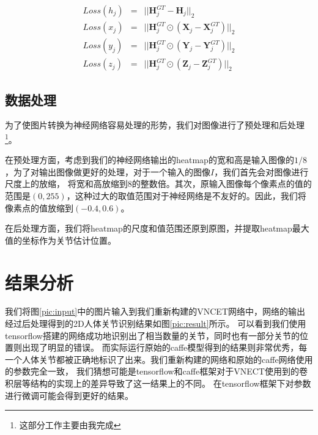 \documentclass[a4paper, 10pt]{article}
\newcommand{\bX}{\mathbf{X}}
\newcommand{\bY}{\mathbf{Y}}
\newcommand{\bZ}{\mathbf{Z}}
\newcommand{\bH}{\mathbf{H}}
\begin{document}
\begin{eqnarray}
        Loss(h_j)&=& || \bH^{GT}_{j}-\bH_j ||_2 \label{eqn:h}\\
        Loss(x_j)&=& || \bH^{GT}_{j}\odot(\bX_j-\bX^{GT}_{j}) ||_2 \label{eqn:x}\\
        Loss(y_j)&=& || \bH^{GT}_{j}\odot(\bY_j-\bY^{GT}_{j}) ||_2 \label{eqn:y}\\
        Loss(z_j)&=& || \bH^{GT}_{j}\odot(\bZ_j-\bZ^{GT}_{j}) ||_2 \label{eqn:z}
\end{eqnarray}


\subsection{数据处理}

\hspace{2em}为了使图片转换为神经网络容易处理的形势，我们对图像进行了预处理和后处理\footnote{这部分工作主要由我完成}。

在预处理方面，考虑到我们的神经网络输出的heatmap的宽和高是输入图像的$1/8$，为了对输出图像做更好的处理，对于一个输入的图像$I$，我们首先会对图像进行尺度上的放缩，
将宽和高放缩到8的整数倍。其次，原输入图像每个像素点的值的范围是$(0,255)$，这种过大的取值范围对于神经网络是不友好的。因此，我们将像素点的值放缩到$(-0.4,0.6)$。

在后处理方面，我们将heatmap的尺度和值范围还原到原图，并提取heatmap最大值的坐标作为关节估计位置。

\section{结果分析}
我们将图\ref{pic:input}中的图片输入到我们重新构建的VNCET网络中，网络的输出经过后处理得到的2D人体关节识别结果如图\ref{pic:result}所示。
可以看到我们使用tensorflow搭建的网络成功地识别出了相当数量的关节，同时也有一部分关节的位置则出现了明显的错误。
而实际运行原始的caffe模型得到的结果则非常优秀，每一个人体关节都被正确地标识了出来。我们重新构建的网络和原始的caffe网络使用的参数完全一致，
我们猜想可能是tensorflow和caffe框架对于VNECT使用到的卷积层等结构的实现上的差异导致了这一结果上的不同。
在tensorflow框架下对参数进行微调可能会得到更好的结果。
\end{document}
